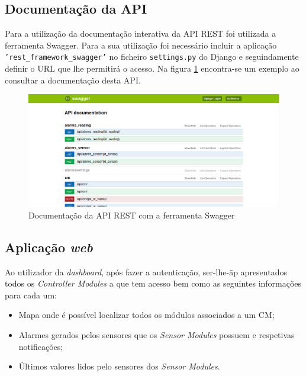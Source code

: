 \subsection{Documentação da API}

Para a utilização da documentação interativa da API REST foi utilizada a ferramenta Swagger. Para a sua utilização foi necessário incluir a aplicação \texttt{'rest\_framework\_swagger'} no ficheiro \texttt{settings.py} do Django e seguindamente definir o \ac{URL} que lhe permitirá o acesso. Na figura \ref{docapi} encontra-se um exemplo ao consultar a documentação desta API. 



\begin{figure}[h]
	\centering
	\includegraphics[width=0.71\linewidth]{prints-web/api-doc.png}
	\caption{Documentação da API REST com a ferramenta Swagger}
	\label{docapi}
\end{figure}

\newpage

\subsection{Aplicação \textit{web}}

Ao utilizador da \textit{dashboard}, após fazer a autenticação, ser-lhe-ãp apresentados todos os \textit{Controller Modules} a que tem acesso bem como as seguintes informações para cada um:


\begin{itemize}
	\item Mapa onde é possível localizar todos os módulos associados a um \acl{CM}; 
	
	\item Alarmes gerados pelos sensores que os \textit{Sensor Modules} possuem e respetivas notificações; 
	
	\item Últimos valores lidos pelo sensores dos \textit{Sensor Modules}.
\end{itemize} 



